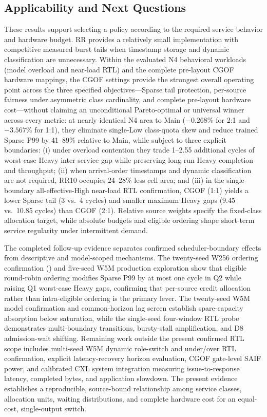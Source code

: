 \subsection{Applicability and Next Questions}
These results support selecting a policy according to the required service behavior and hardware budget. RR provides a relatively small implementation with competitive measured burst tails when timestamp storage and dynamic classification are unnecessary. Within the evaluated N4 behavioral workloads (model overload and near-load RTL) and the complete pre-layout CGOF hardware mappings, the CGOF settings provide the strongest overall operating point across the three specified objectives—Sparse tail protection, per-source fairness under asymmetric class cardinality, and complete pre-layout hardware cost—without claiming an unconditional Pareto-optimal or universal winner across every metric: at nearly identical N4 area to Main ($-0.268\%$ for 2:1 and $-3.567\%$ for 1:1), they eliminate single-Low class-quota skew and reduce trained Sparse P99 by 41--89\% relative to Main, while subject to three explicit boundaries: (i) under overload contention they trade 1--2.55 additional cycles of worst-case Heavy inter-service gap while preserving long-run Heavy completion and throughput; (ii) when arrival-order timestamps and dynamic classification are not required, RR10 occupies 24--28\% less cell area; and (iii) in the single-boundary all-effective-High near-load RTL confirmation, CGOF (1:1) yields a lower Sparse tail (3 vs.\ 4 cycles) and smaller maximum Heavy gaps (9.45 vs.\ 10.85 cycles) than CGOF (2:1). Relative source weights specify the fixed-class allocation target, while absolute budgets and eligible ordering shape short-term service regularity under intermittent demand.

The completed follow-up evidence separates confirmed scheduler-boundary effects from descriptive and model-scoped mechanisms. The twenty-seed W256 ordering confirmation () and five-seed W5M production exploration show that eligible round-robin ordering modifies Sparse P99 by at most one cycle in Q2 while raising Q1 worst-case Heavy gaps, confirming that per-source credit allocation rather than intra-eligible ordering is the primary lever. The twenty-seed W5M model confirmation and common-horizon lag screen establish spare-capacity absorption below saturation, while the single-seed four-window RTL probe demonstrates multi-boundary transitions, bursty-stall amplification, and D8 admission-wait shifting. Remaining work outside the present confirmed RTL scope includes multi-seed W5M dynamic role-switch and under/over RTL confirmation, explicit latency-recovery horizon evaluation, CGOF gate-level SAIF power, and calibrated CXL system integration measuring issue-to-response latency, completed bytes, and application slowdown. The present evidence establishes a reproducible, source-bound relationship among service classes, allocation units, waiting distributions, and complete hardware cost for an equal-cost, single-output switch.

